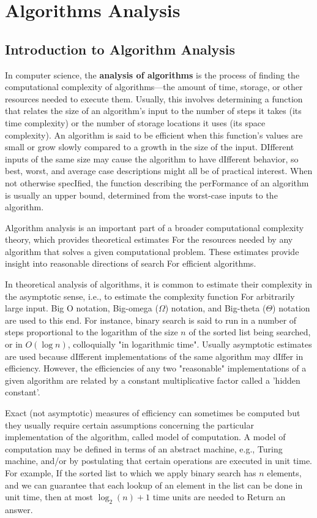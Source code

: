 \documentclass[12pt]{book} %
\begin{document}
\chapter{Algorithms Analysis}

\section{Introduction to Algorithm Analysis}
In computer science, the \textbf{analysis of algorithms} is the process of finding the computational complexity of algorithms—the amount of time, storage, or other resources needed to execute them. Usually, this involves determining a function that relates the size of an algorithm's input to the number of steps it takes (its time complexity) or the number of storage locations it uses (its space complexity). An algorithm is said to be efficient when this function's values are small or grow slowly compared to a growth in the size of the input. DIfferent inputs of the same size may cause the algorithm to have dIfferent behavior, so best, worst, and average case descriptions might all be of practical interest. When not otherwise specIfied, the function describing the perFormance of an algorithm is usually an upper bound, determined from the worst-case inputs to the algorithm.

 Algorithm analysis is an important part of a broader computational complexity theory, which provides theoretical estimates For the resources needed by any algorithm that solves a given computational problem. These estimates provide insight into reasonable directions of search For efficient algorithms.

In theoretical analysis of algorithms, it is common to estimate their complexity in the asymptotic sense, i.e., to estimate the complexity function For arbitrarily large input. Big O notation, Big-omega (\(\Omega\)) notation, and Big-theta (\(\Theta\)) notation are used to this end. For instance, binary search is said to run in a number of steps proportional to the logarithm of the size $n$ of the sorted list being searched, or in $O(\log n)$, colloquially "in logarithmic time". Usually asymptotic estimates are used because dIfferent implementations of the same algorithm may dIffer in efficiency. However, the efficiencies of any two "reasonable" implementations of a given algorithm are related by a constant multiplicative factor called a 'hidden constant'.

Exact (not asymptotic) measures of efficiency can sometimes be computed but they usually require certain assumptions concerning the particular implementation of the algorithm, called model of computation. A model of computation may be defined in terms of an abstract machine, e.g., Turing machine, and/or by postulating that certain operations are executed in unit time. For example, If the sorted list to which we apply binary search has $n$ elements, and we can guarantee that each lookup of an element in the list can be done in unit time, then at most $\log_2(n) + 1$ time units are needed to Return an answer.
\end{document}
